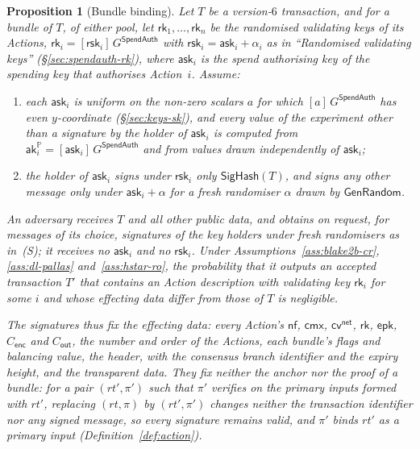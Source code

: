 \documentclass[11pt,a4paper]{article}
\newtheorem{proposition}[theorem]{Proposition}
\theoremstyle{definition}
\newcommand{\PP}{\mathbb{P}}
\newcommand{\nfsym}{\mathsf{nf}}
\newcommand{\cmx}{\mathsf{cmx}}
\newcommand{\cvsym}{\mathsf{cv}}
\newcommand{\rk}{\mathsf{rk}}
\newcommand{\ask}{\ensuremath{\mathsf{ask}}}
\newcommand{\aksym}{\ensuremath{\mathsf{ak}}}
\newcommand{\rsk}{\ensuremath{\mathsf{rsk}}}
\begin{document}
\begin{proposition}[Bundle binding]\label{prop:bundle-binding}
Let $T$ be a version-$6$ transaction, and for a bundle of $T$, of either
pool, let $\rk_1, \dots, \rk_n$ be the randomised validating keys of its
Actions, $\rk_i = [\rsk_i]\,G^{\mathsf{SpendAuth}}$ with
$\rsk_i = \ask_i + \alpha_i$ as in ``Randomised validating keys''
(\S\ref{sec:spendauth-rk}), where $\ask_i$ is the spend authorising key of
the spending key that authorises Action~$i$. Assume:
\begin{enumerate}
\item[(H)] each $\ask_i$ is uniform on the non-zero scalars $a$ for which
  $[a]\,G^{\mathsf{SpendAuth}}$ has even $y$-coordinate (\S\ref{sec:keys-sk}),
  and every value of the experiment other than a signature by the holder of
  $\ask_i$ is computed from $\aksym^{\PP}_i = [\ask_i]\,G^{\mathsf{SpendAuth}}$
  and from values drawn independently of $\ask_i$;
\item[(S)] the holder of $\ask_i$ signs under $\rsk_i$ only
  $\mathsf{SigHash}(T)$, and signs any other message only under
  $\ask_i + \alpha$ for a fresh randomiser $\alpha$ drawn by
  $\mathsf{GenRandom}$.
\end{enumerate}
An adversary receives $T$ and all other public data, and obtains on request,
for messages of its choice, signatures of the key holders under fresh
randomisers as in~(S); it receives no $\ask_i$ and no $\rsk_i$. Under
Assumptions~\ref{ass:blake2b-cr}, \ref{ass:dl-pallas}
and~\ref{ass:hstar-ro}, the probability that it outputs an accepted
transaction $T'$ that contains an Action description with validating key
$\rk_i$ for some $i$ and whose effecting data differ from those of $T$ is
negligible.

The signatures thus fix the effecting data: every Action's $\nfsym$,
$\cmx$, $\cvsym^{\mathsf{net}}$, $\rk$, $\mathsf{epk}$, $C_{\mathsf{enc}}$
and $C_{\mathsf{out}}$, the number and order of the Actions, each bundle's
flags and balancing value, the header, with the consensus branch identifier
and the expiry height, and the transparent data. They fix neither the anchor
nor the proof of a bundle: for a pair $(\mathit{rt}', \pi')$ such that
$\pi'$ verifies on the primary inputs formed with $\mathit{rt}'$, replacing
$(\mathit{rt}, \pi)$ by $(\mathit{rt}', \pi')$ changes neither the
transaction identifier nor any signed message, so every signature remains
valid, and $\pi'$ binds $\mathit{rt}'$ as a primary input
(Definition~\ref{def:action}).
\end{proposition}
\end{document}
